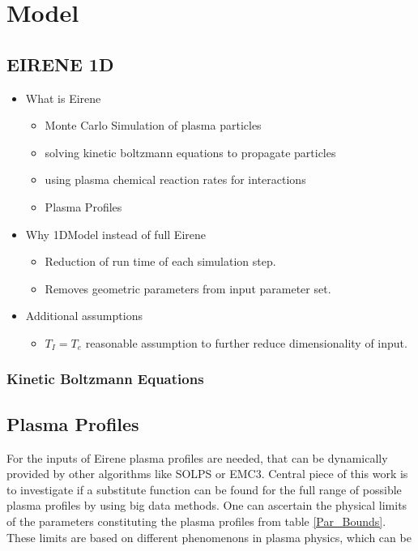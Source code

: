 \chapter{Model}
	\section{EIRENE 1D}
		\begin{itemize}
			\item What is Eirene\\
				\begin{itemize}
					\item Monte Carlo Simulation of plasma particles
					\item solving kinetic boltzmann equations to propagate particles
					\item using plasma chemical reaction rates for interactions
					\item Plasma Profiles
				\end{itemize}
			\item Why 1DModel instead of full Eirene\\
				\begin{itemize}
					\item Reduction of run time of each simulation step.
					\item Removes geometric parameters from input parameter set.
				\end{itemize}
			\item Additional assumptions\\
				\begin{itemize}
					\item $T_I =T_e$ reasonable assumption to further reduce dimensionality of input.
				\end{itemize}
		\end{itemize}
		\subsection{Kinetic Boltzmann Equations}
	\section{Plasma Profiles}
		For the inputs of Eirene plasma profiles are needed, that can be dynamically provided by other algorithms like SOLPS or EMC3. Central piece of this work is to investigate if a substitute function can be found for the full range of possible plasma profiles by using big data methods. One can ascertain the physical limits of the parameters constituting the plasma profiles from table \ref{Par_Bounds}. These limits are based on different phenomenons in plasma physics, which can be 
